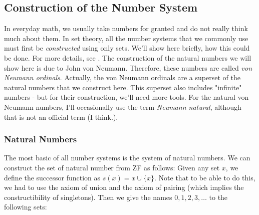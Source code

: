 \subsection{Construction of the Number System}
In everyday math, we usually take numbers for granted and do not really think much about them. In set theory, all the number systems that we commonly use must first be \emph{constructed} using only sets. We'll show here briefly, how this could be done. For more details, see \cite{PDF_MathFAQ}. The construction of the natural numbers we will show here is due to John von Neumann. Therefore, these numbers are called \emph{von Neumann ordinals}. Actually, the von Neumann ordinals are a superset of the natural numbers that we construct here. This superset also includes "infinite" numbers - but for their construction, we'll need more tools. For the natural von Neumann numbers, I'll occasionally use the term \emph{Neumann natural}, although that is not an official term (I think.).





\subsubsection{Natural Numbers}
The most basic of all number systems is the system of natural numbers. We can construct the set of natural number from ZF as follows: Given any set $x$, we define the successor function as $s(x) = x \cup \{ x \}$. Note that to be able to do this, we had to use the axiom of union and the axiom of pairing (which implies the constructibility of singletons). Then we give the names $0,1,2,3,\ldots$ to the following sets:

